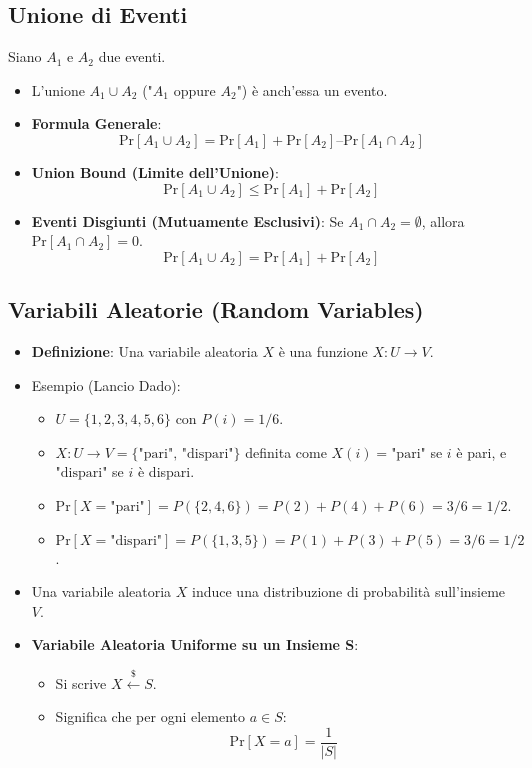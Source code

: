 \subsection{Unione di Eventi}
Siano $A_1$ e $A_2$ due eventi.
\begin{itemize}
    \item L'unione $A_1 \cup A_2$ ("$A_1$ oppure $A_2$") è anch'essa un evento.
    \item \textbf{Formula Generale}:
    \[ \text{Pr}[A_1 \cup A_2] = \text{Pr}[A_1] + \text{Pr}[A_2] – \text{Pr}[A_1 \cap A_2] \]
    \item \textbf{Union Bound (Limite dell'Unione)}:
    \[ \text{Pr}[A_1 \cup A_2] \le \text{Pr}[A_1] + \text{Pr}[A_2] \]
    \item \textbf{Eventi Disgiunti (Mutuamente Esclusivi)}: Se $A_1 \cap A_2 = \emptyset$, allora $\text{Pr}[A_1 \cap A_2] = 0$.
    \[ \text{Pr}[A_1 \cup A_2] = \text{Pr}[A_1] + \text{Pr}[A_2] \]
\end{itemize}

\subsection{Variabili Aleatorie (Random Variables)}
\begin{itemize}
    \item \textbf{Definizione}: Una variabile aleatoria $X$ è una funzione $X : U \to V$.
    \item Esempio (Lancio Dado):
    \begin{itemize}
        \item $U = \{1, 2, 3, 4, 5, 6\}$ con $P(i) = 1/6$.
        \item $X: U \to V=\{\text{"pari", "dispari"}\}$ definita come $X(i) = \text{"pari"}$ se $i$ è pari, e $\text{"dispari"}$ se $i$ è dispari.
        \item $\text{Pr}[X=\text{"pari"}] = P(\{2, 4, 6\}) = P(2)+P(4)+P(6) = 3/6 = 1/2$.
        \item $\text{Pr}[X=\text{"dispari"}] = P(\{1, 3, 5\}) = P(1)+P(3)+P(5) = 3/6 = 1/2$.
    \end{itemize}
    \item Una variabile aleatoria $X$ induce una distribuzione di probabilità sull'insieme $V$.
    \item \textbf{Variabile Aleatoria Uniforme su un Insieme S}:
    \begin{itemize}
        \item Si scrive $X \stackrel{\$}{\leftarrow} S$.
        \item Significa che per ogni elemento $a \in S$:
        \[ \text{Pr}[X=a] = \frac{1}{|S|} \]
    \end{itemize}
\end{itemize}

